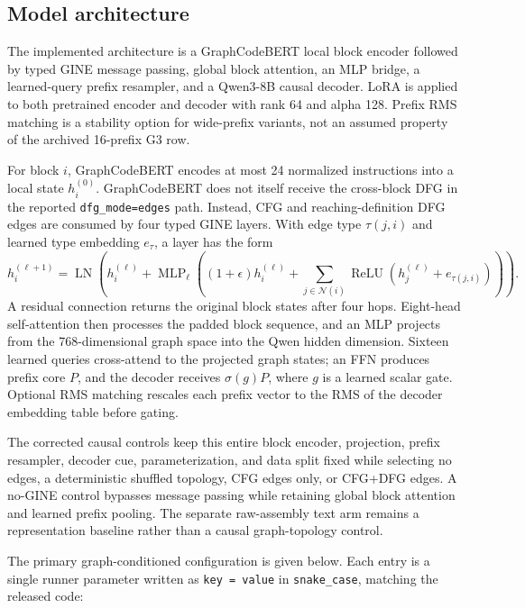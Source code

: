 \documentclass[11pt]{article}
\begin{document}
\subsection{Model architecture}

The implemented architecture is a GraphCodeBERT local block encoder followed by typed GINE message passing, global block attention, an MLP bridge, a learned-query prefix resampler, and a Qwen3-8B causal decoder. LoRA is applied to both pretrained encoder and decoder with rank 64 and alpha 128. Prefix RMS matching is a stability option for wide-prefix variants, not an assumed property of the archived 16-prefix G3 row.

For block \(i\), GraphCodeBERT encodes at most 24 normalized instructions into a local state \(h_i^{(0)}\). GraphCodeBERT does not itself receive the cross-block DFG in the reported \texttt{dfg\_mode=edges} path. Instead, CFG and reaching-definition DFG edges are consumed by four typed GINE layers. With edge type \(\tau(j,i)\) and learned type embedding \(e_{\tau}\), a layer has the form
\[
 h_i^{(\ell+1)}=\operatorname{LN}\!\left(h_i^{(\ell)}+
 \operatorname{MLP}_{\ell}\!\left((1+\epsilon)h_i^{(\ell)}+
 \sum_{j\in\mathcal{N}(i)}\operatorname{ReLU}(h_j^{(\ell)}+e_{\tau(j,i)})\right)\right).
\]
A residual connection returns the original block states after four hops. Eight-head self-attention then processes the padded block sequence, and an MLP projects from the 768-dimensional graph space into the Qwen hidden dimension. Sixteen learned queries cross-attend to the projected graph states; an FFN produces prefix core \(P\), and the decoder receives \(\sigma(g)P\), where \(g\) is a learned scalar gate. Optional RMS matching rescales each prefix vector to the RMS of the decoder embedding table before gating.

The corrected causal controls keep this entire block encoder, projection, prefix resampler, decoder cue, parameterization, and data split fixed while selecting no edges, a deterministic shuffled topology, CFG edges only, or CFG+DFG edges. A no-GINE control bypasses message passing while retaining global block attention and learned prefix pooling. The separate raw-assembly text arm remains a representation baseline rather than a causal graph-topology control.

The primary graph-conditioned configuration is given below. Each entry is a single runner parameter written as \texttt{key = value} in \texttt{snake\_case}, matching the released code:
\end{document}
